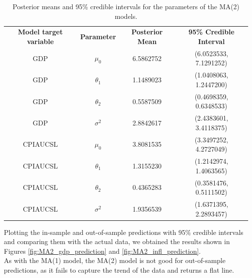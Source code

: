 \begin{table}[H]
    \centering
    \begin{tabular}{c|c|c|c}
        \textbf{Model target variable } & \textbf{Parameter } & \textbf{Posterior Mean } & \textbf{95\% Credible Interval } \\
        \cline{1-4}
        GDP      & $\mu_0$    & 6.5862752 & (6.0523533, 7.1291252) \\
        GDP      & $\theta_1$ & 1.1489023 & (1.0408063, 1.2447200) \\
        GDP      & $\theta_2$ & 0.5587509 & (0.4698359, 0.6348533) \\
        GDP      & $\sigma^2$ & 2.8842617 & (2.4383601, 3.4118375) \\
        CPIAUCSL & $\mu_0$    & 3.8081535 & (3.3497252, 4.2727049) \\
        CPIAUCSL & $\theta_1$ & 1.3155230 & (1.2142974, 1.4063565) \\
        CPIAUCSL & $\theta_2$ & 0.4365283 & (0.3581476, 0.5111502) \\
        CPIAUCSL & $\sigma^2$ & 1.9356539 & (1.6371395, 2.2893457) \\
    \end{tabular}
    \caption{Posterior means and 95\% credible intervals for the parameters of the MA(2) models.}
    \label{tab:MA2_posteriors}
\end{table}
Plotting the in-sample and out-of-sample predictions with 95\% credible intervals and comparing them with the actual data, we obtained the results shown in Figures \ref{fig:MA2_gdp_prediction} and \ref{fig:MA2_infl_prediction}. \\
As with the MA(1) model, the MA(2) model is not good for out-of-sample predictions, as it fails to capture the trend of the data and returns a flat line.
